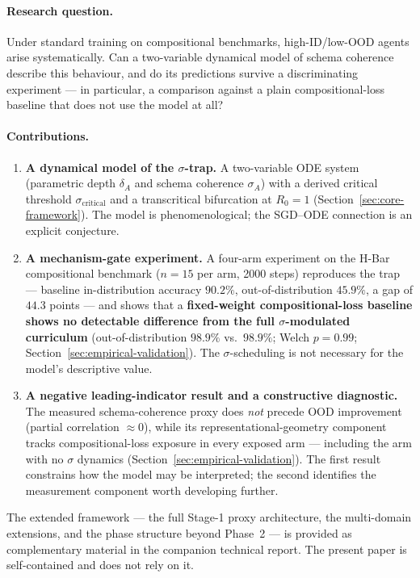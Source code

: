 \documentclass{article}
\theoremstyle{definition}
\begin{document}
\paragraph*{Research question.}
Under standard training on compositional benchmarks, high-ID/low-OOD
agents arise systematically. Can a two-variable dynamical model of
schema coherence describe this behaviour, and do its predictions
survive a discriminating experiment --- in particular, a comparison
against a plain compositional-loss baseline that does not use the
model at all?

\paragraph*{Contributions.}
\begin{enumerate}[nosep]
\item \textbf{A dynamical model of the $\sigma$-trap.}
  A two-variable ODE system (parametric depth $\delta_A$ and schema
  coherence $\sigma_A$) with a derived critical threshold
  $\sigma_{\text{critical}}$ and a transcritical bifurcation at
  $R_0 = 1$ (Section~\ref{sec:core-framework}). The model is
  phenomenological; the SGD--ODE connection is an explicit conjecture.
\item \textbf{A mechanism-gate experiment.}
  A four-arm experiment on the H-Bar compositional benchmark ($n = 15$
  per arm, 2000 steps) reproduces the trap --- baseline in-distribution
  accuracy $90.2\%$, out-of-distribution $45.9\%$, a gap of $44.3$
  points --- and shows that a \textbf{fixed-weight compositional-loss
  baseline shows no detectable difference from the full
  $\sigma$-modulated curriculum} (out-of-distribution $98.9\%$ vs.\
  $98.9\%$; Welch $p = 0.99$; Section~\ref{sec:empirical-validation}).
  The $\sigma$-scheduling is not necessary for the model's descriptive
  value.
\item \textbf{A negative leading-indicator result and a constructive
  diagnostic.}
  The measured schema-coherence proxy does \emph{not} precede OOD
  improvement (partial correlation $\approx 0$), while its
  representational-geometry component tracks compositional-loss
  exposure in every exposed arm --- including the arm with no $\sigma$
  dynamics (Section~\ref{sec:empirical-validation}). The first result
  constrains how the model may be interpreted; the second identifies
  the measurement component worth developing further.
\end{enumerate}

The extended framework --- the full Stage-1 proxy architecture, the
multi-domain extensions, and the phase structure beyond Phase~2 --- is
provided as complementary material in the companion technical report.
The present paper is self-contained and does not rely on it.
\end{document}
